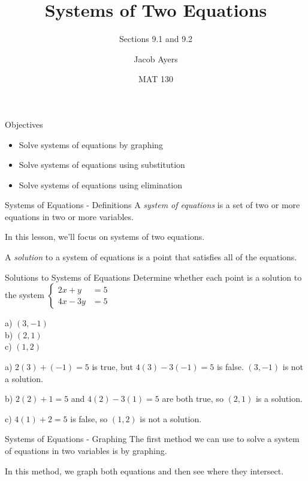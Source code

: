 \documentclass[t, aspectratio=169]{beamer}
\title[9.1 and 9.2]{Systems of Two Equations}
\subtitle{Sections 9.1 and 9.2}
\author{Jacob Ayers}
\institute{Lesson \#22}
\date{MAT 130}
\begin{document}
	
	\begin{frame}
		\titlepage
	\end{frame}
	
	\begin{frame}{Objectives}
		\begin{itemize}
			\item Solve systems of equations by graphing
			\item Solve systems of equations using substitution
			\item Solve systems of equations using elimination
		\end{itemize}
	\end{frame}

	\begin{frame}{Systems of Equations - Definitions}
		A \textit{system of equations} is a set of two or more equations in two or more variables. \pause
		
		In this lesson, we'll focus on systems of two equations. \pause
		
		A \textit{solution} to a system of equations is a point that satisfies all of the equations.
	\end{frame}

	\begin{frame}{Solutions to Systems of Equations}
		Determine whether each point is a solution to the system $\begin{cases}
			2x + y &= 5 \\
			4x - 3y &= 5
		\end{cases}$
		
		a) $(3, -1)$ \\
		b) $(2,1)$ \\
		c) $(1,2)$ \pause
		
		a) $2(3) + (-1) = 5$ is true, but $4(3) - 3(-1) = 5$ is false. $(3, -1)$ is not a solution. \pause
		
		b) $2(2) + 1 = 5$ and $4(2) - 3(1) = 5$ are both true, so $(2, 1)$ is a solution. \pause
		
		c) $4(1) + 2 = 5$ is false, so $(1, 2)$ is not a solution.
	\end{frame}

	\begin{frame}{Systems of Equations - Graphing}
		The first method we can use to solve a system of equations in two variables is by graphing. \pause
		
		In this method, we graph both equations and then see where they intersect. \pause
	\end{frame}
\end{document}
